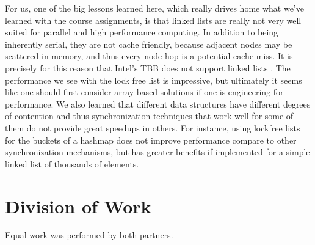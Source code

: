 \documentclass[11pt]{article}
\begin{document}
For us, one of the big lessons learned here, which really drives home what we've learned
with the course assignments, is that linked lists are really not very well
suited for parallel and high performance computing. In addition to being
inherently serial, they are not cache friendly, because adjacent nodes may be
scattered in memory, and thus every node hop is a potential cache miss. It is
precisely for this reason that Intel's TBB does not support linked lists
\cite{tbbNoList}. The performance we see with the lock free list is impressive, but
ultimately it seems like one should first consider array-based solutions if one
is engineering for performance.
We also learned that different data structures have different degrees of contention
and thus synchronization techniques that work well for some of them do not
provide great speedups in others. For instance, using lockfree lists for the buckets
of a hashmap does not improve performance compare to other synchronization
mechanisms, but has greater benefits if implemented for a simple linked list of thousands of elements.


\section{Division of Work}
Equal work was performed by both partners.

\printbibliography
\end{document}
